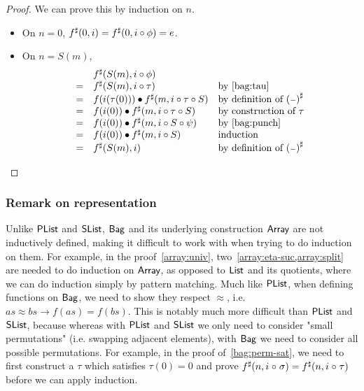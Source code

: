 \begin{proof}
    We can prove this by induction on $n$.
    \begin{itemize}
        \item On $n = 0$, $\ext{f}(0, i) \id \ext{f}(0, i \circ \phi) = e$.
        \item On $n = S(m)$,
              \[
                  \begin{array}{rll}
                        & \ext{f}(S(m), i \circ \phi)                          &                                          \\
                      = & \ext{f}(S(m), i \circ \tau)                          & \text{by~\cref{bag:tau}}                 \\
                      = & f(i(\tau(0))) \mult \ext{f}(m, i \circ \tau \circ S) & \text{by definition of $\ext{(\blank)}$} \\
                      = & f(i(0)) \mult \ext{f}(m, i \circ \tau \circ S)       & \text{by construction of $\tau$}         \\
                      = & f(i(0)) \mult \ext{f}(m, i \circ S \circ \psi)       & \text{by~\cref{bag:punch}}               \\
                      = & f(i(0)) \mult \ext{f}(m, i \circ S)                  & \text{induction}                         \\
                      = & \ext{f}(S(m), i)                                     & \text{by definition of $\ext{(\blank)}$}
                  \end{array}
              \]
    \end{itemize}
\end{proof}

\subsubsection*{Remark on representation}\label{bag:rep}

Unlike $\operatorname{\mathsf{PList}}$ and $\operatorname{\mathsf{SList}}$, $\operatorname{\mathsf{Bag}}$ and its underlying construction $\operatorname{\mathsf{Array}}$ are not inductively defined,
making it difficult to work with when trying to do induction on them. For example,
in the proof~\cref{array:univ}, two~\cref{array:eta-suc,array:split} are needed to do
induction on $\operatorname{\mathsf{Array}}$, as opposed to $\operatorname{\mathsf{List}}$ and its quotients, where we can do induction simply by
pattern matching. Much like $\operatorname{\mathsf{PList}}$, when defining functions on $\operatorname{\mathsf{Bag}}$, we need to show they respect
$\approx$, i.e. $as \approx bs \to f(as) = f(bs)$. This is notably much more difficult than
$\operatorname{\mathsf{PList}}$ and $\operatorname{\mathsf{SList}}$, because whereas with $\operatorname{\mathsf{PList}}$ and $\operatorname{\mathsf{SList}}$ we only need to consider "small permutations"
(i.e. swapping adjacent elements), with $\operatorname{\mathsf{Bag}}$ we need to consider all possible permutations. For example,
in the proof of~\cref{bag:perm-sat}, we need to first construct a $\tau$ which satisfies $\tau(0) = 0$ and prove
${f}^{\sharp}(n, i \mathrel{\circ} \sigma) = {f}^{\sharp}(n, i \mathrel{\circ} \tau)$ before we can apply induction.

